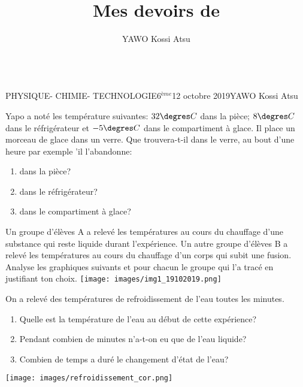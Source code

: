 \documentclass[12pt,a4paper]{book}
\author{YAWO Kossi Atsu}
\title{Mes devoirs de \matiere}
\newcommand{\prof}{YAWO Kossi Atsu}
\newcommand{\matiere}{\\PHYSIQUE- CHIMIE- TECHNOLOGIE}
\newcommand{\classe}{6$^{ème}$}
\begin{document}
\begin{td}{\matiere}{\classe}{12 octobre 2019}{\prof}
\begin{exo}
Yapo a noté les température suivantes: $32\degres C$ dans la pièce; $8 \degres C$ dans le réfrigérateur et $-5\degres C$ dans le compartiment à glace. Il place un morceau de glace dans un verre. Que trouvera-t-il dans le verre, au bout d'une heure par exemple 'il l'abandonne:
\begin{enumerate}
\item dans la pièce?
\item dans le réfrigérateur?
\item dans le compartiment à glace?
\end{enumerate} 
\end{exo}
\vspace{0.5cm}

\begin{exo}
\begin{multicols}{2}
Un groupe d'élèves A a relevé les températures au cours du chauffage d'une substance qui reste liquide durant l'expérience. Un autre groupe d'élèves B a relevé les températures au cours du chauffage d'un corps qui subit une fusion. Analyse les graphiques suivants et pour chacun le groupe qui l'a tracé en justifiant ton choix.
\texttt{[image: images/img1\_19102019.png]}
\end{multicols}
\end{exo}
\vspace{0.5cm}

\begin{exo}
On a relevé des températures de refroidissement de l'eau toutes les minutes.
\begin{multicols}{2}
\begin{enumerate}
\item Quelle est la température de l'eau au début de cette expérience? 
\item Pendant combien de minutes n'a-t-on eu que de l'eau liquide?
\item Combien de temps a duré le changement d'état de l'eau?
\end{enumerate}
\vspace{2cm}
\texttt{[image: images/refroidissement\_cor.png]}
\end{multicols}
\end{exo}
\vspace{0.5cm}


\end{td}
\end{document}
